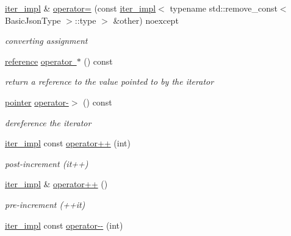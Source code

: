 \begin{DoxyCompactItemize}
\mbox{\hyperlink{classnlohmann_1_1detail_1_1iter__impl}{iter\+\_\+impl}} \& \mbox{\hyperlink{classnlohmann_1_1detail_1_1iter__impl_a7159ed1cfe7c423a2baef8bea0c94509}{operator=}} (const \mbox{\hyperlink{classnlohmann_1_1detail_1_1iter__impl}{iter\+\_\+impl}}$<$ typename std\+::remove\+\_\+const$<$ Basic\+Json\+Type $>$\+::type $>$ \&other) noexcept
\begin{DoxyCompactList}\small\item\em converting assignment \end{DoxyCompactList}\item 
\mbox{\hyperlink{classnlohmann_1_1detail_1_1iter__impl_a5be8001be099c6b82310f4d387b953ce}{reference}} \mbox{\hyperlink{classnlohmann_1_1detail_1_1iter__impl_ad6f85e5945429bbdb5a6bef8d3e99d5b}{operator $\ast$}} () const
\begin{DoxyCompactList}\small\item\em return a reference to the value pointed to by the iterator \end{DoxyCompactList}\item 
\mbox{\hyperlink{classnlohmann_1_1detail_1_1iter__impl_a69e52f890ce8c556fd68ce109e24b360}{pointer}} \mbox{\hyperlink{classnlohmann_1_1detail_1_1iter__impl_a6da3d2b34528aff328f3dcb513076dec}{operator-\/$>$}} () const
\begin{DoxyCompactList}\small\item\em dereference the iterator \end{DoxyCompactList}\item 
\mbox{\hyperlink{classnlohmann_1_1detail_1_1iter__impl}{iter\+\_\+impl}} const \mbox{\hyperlink{classnlohmann_1_1detail_1_1iter__impl_a7d2397773b2dce42f30f0375a6a1d850}{operator++}} (int)
\begin{DoxyCompactList}\small\item\em post-\/increment (it++) \end{DoxyCompactList}\item 
\mbox{\hyperlink{classnlohmann_1_1detail_1_1iter__impl}{iter\+\_\+impl}} \& \mbox{\hyperlink{classnlohmann_1_1detail_1_1iter__impl_abdfe2a7f464400a7ab572782d14b922f}{operator++}} ()
\begin{DoxyCompactList}\small\item\em pre-\/increment (++it) \end{DoxyCompactList}\item 
\mbox{\hyperlink{classnlohmann_1_1detail_1_1iter__impl}{iter\+\_\+impl}} const \mbox{\hyperlink{classnlohmann_1_1detail_1_1iter__impl_a1fc43e764467b8ea4a4cdd01f629d757}{operator-\/-\/}} (int)

\end{DoxyCompactItemize}
